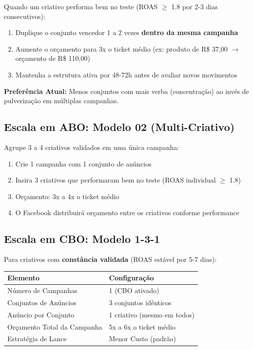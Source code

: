\documentclass[12pt, a4paper]{article}
\newcommand{\reais}[1]{R\$ #1}
\begin{document}
Quando um criativo performa bem no teste (ROAS $\geq$ 1.8 por 2-3 dias consecutivos):

\begin{enumerate}
    \item Duplique o conjunto vencedor 1 a 2 vezes \textbf{dentro da mesma campanha}
    \item Aumente o orçamento para 3x o ticket médio (ex: produto de \reais{37,00} $\rightarrow$ orçamento de \reais{110,00})
    \item Mantenha a estrutura ativa por 48-72h antes de avaliar novos movimentos
\end{enumerate}

\textcolor{warningOrange}{\textbf{Preferência Atual:}} Menos conjuntos com mais verba (concentração) ao invés de pulverização em múltiplas campanhas.

\needspace{6cm}
\subsection{Escala em ABO: Modelo 02 (Multi-Criativo)}

Agrupe 3 a 4 criativos validados em uma única campanha:

\begin{enumerate}
    \item Crie 1 campanha com 1 conjunto de anúncios
    \item Insira 3 criativos que performaram bem no teste (ROAS individual $\geq$ 1.8)
    \item Orçamento: 3x a 4x o ticket médio
    \item O Facebook distribuirá orçamento entre os criativos conforme performance
\end{enumerate}

\subsection{Escala em CBO: Modelo 1-3-1}

Para criativos com \textbf{constância validada} (ROAS estável por 5-7 dias):

\begin{table}[H]
    \centering
    \renewcommand{\arraystretch}{1.4}
    \begin{tabularx}{\textwidth}{X X}
        \toprule
        \rowcolor{tableHeader} \textbf{Elemento} & \textbf{Configuração} \\
        \midrule
        Número de Campanhas & 1 (CBO ativado) \\
        \rowcolor{lightGray}
        Conjuntos de Anúncios & 3 conjuntos idênticos \\
        Anúncio por Conjunto & 1 criativo (mesmo em todos) \\
        \rowcolor{lightGray}
        Orçamento Total da Campanha & 5x a 6x o ticket médio \\
        Estratégia de Lance & Menor Custo (padrão) \\
        \bottomrule
    \end{tabularx}
\end{table}
\end{document}
